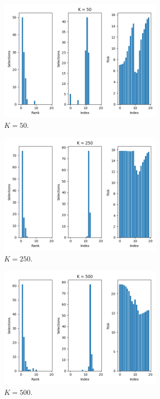 \documentclass[11pt,letterpaper]{article}
\begin{document}
\begin{figure}[H]
  \centering
    \includegraphics[width=0.7\textwidth]{images/K=50.png}
  \caption{$K = 50$.}
\end{figure}

\begin{figure}[H]
  \centering
    \includegraphics[width=0.7\textwidth]{images/K=250.png}
  \caption{$K = 250$.}
\end{figure}

\begin{figure}[H]
  \centering
    \includegraphics[width=0.7\textwidth]{images/K=500.png}
  \caption{$K = 500$.}
\end{figure}
\end{document}
